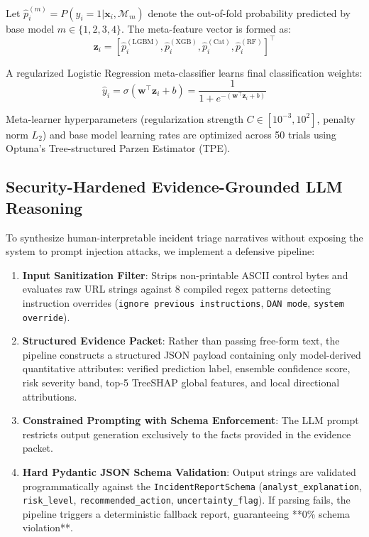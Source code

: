 \documentclass[journal]{IEEEtran}
\begin{document}
Let $\hat{p}_i^{(m)} = P(y_i = 1 | \mathbf{x}_i, \mathcal{M}_m)$ denote the out-of-fold probability predicted by base model $m \in \{1, 2, 3, 4\}$. The meta-feature vector is formed as:
\begin{equation}
\mathbf{z}_i = \left[ \hat{p}_i^{(\text{LGBM})}, \hat{p}_i^{(\text{XGB})}, \hat{p}_i^{(\text{Cat})}, \hat{p}_i^{(\text{RF})} \right]^\top
\end{equation}

A regularized Logistic Regression meta-classifier learns final classification weights:
\begin{equation}
\hat{y}_i = \sigma(\mathbf{w}^\top \mathbf{z}_i + b) = \frac{1}{1 + e^{-(\mathbf{w}^\top \mathbf{z}_i + b)}}
\end{equation}

Meta-learner hyperparameters (regularization strength $C \in [10^{-3}, 10^2]$, penalty norm $L_2$) and base model learning rates are optimized across 50 trials using Optuna's Tree-structured Parzen Estimator (TPE).

\subsection{Security-Hardened Evidence-Grounded LLM Reasoning}
To synthesize human-interpretable incident triage narratives without exposing the system to prompt injection attacks, we implement a defensive pipeline:
\begin{enumerate}
    \item \textbf{Input Sanitization Filter}: Strips non-printable ASCII control bytes and evaluates raw URL strings against 8 compiled regex patterns detecting instruction overrides (\texttt{ignore previous instructions}, \texttt{DAN mode}, \texttt{system override}).
    \item \textbf{Structured Evidence Packet}: Rather than passing free-form text, the pipeline constructs a structured JSON payload containing only model-derived quantitative attributes: verified prediction label, ensemble confidence score, risk severity band, top-5 TreeSHAP global features, and local directional attributions.
    \item \textbf{Constrained Prompting with Schema Enforcement}: The LLM prompt restricts output generation exclusively to the facts provided in the evidence packet.
    \item \textbf{Hard Pydantic JSON Schema Validation}: Output strings are validated programmatically against the \texttt{IncidentReportSchema} (\texttt{analyst\_explanation}, \texttt{risk\_level}, \texttt{recommended\_action}, \texttt{uncertainty\_flag}). If parsing fails, the pipeline triggers a deterministic fallback report, guaranteeing **0\% schema violation**.
\end{enumerate}
\end{document}
